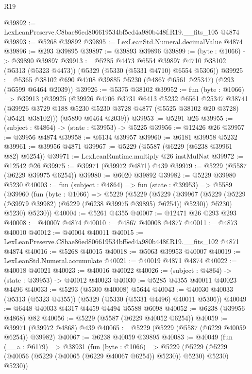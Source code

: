 \begin{lexlean}{R19}
\begin{coremodule}
@39892 := LexLeanPreserve.C8bae86ed806619534bf5ed4a980b448f.R19.__fits_105 @4874
@39893 := @5268 @39892
@39895 := LexLeanStd.Numeral.decimalValue @4874
@39896 := @293 @39895
@39897 := @39893 @39896
@39899 := (byte : @1066) -> @39890 @39897
@39913 := @5285
    @4473
    @6554
    @39897
    @4710
    @38102
    (@5313 (@5323 @4473))
    (@5329 (@5330 (@5331 @4710) @6554 @5306))
@39925 := @5365 @38102 @690 @4708 @39885 @5230 (@4867 @6561 @25347) (@293 (@5599 @6464 @2039))
@39926 := @5375 @38102
@39952 := fun (byte : @1066) =>
  @39913
    (@39925
      (@39926
        @4706
        @3731
        @6413
        @5232
        @6561
        @25347
        @38741
        (@39926 @3729 @188 @5230 @5230 @3728 @4877 (@5525 @38102 @20 @3728) (@5421 @38102)))
      (@5890 @6464 @2039))
@39953 := @5291 @26
@39955 := (subject : @4864) -> (state : @39953) -> @5225
@39956 := @12426 @26
@39957 := @39956 @4874
@39958 := @6134 @39957
@39960 := @6181 @39958 @5232
@39961 := @39956 @4871
@39967 := @5229 (@5587 (@6229 (@6238 @39961 @82) @6254))
@39971 := LexLeanRuntime.multiply @26 instMulNat
@39972 := @12542 @26
@39975 := @39971 (@39972 @4871) @439
@39979 := @5229 (@5587 (@6229 @39975 @6254))
@39980 := @6020 @39892
@39982 := @5229 @39980 @5230
@40003 := fun (subject : @4864) =>
  fun (state : @39953) =>
  @5589
    (@39960
      (fun (byte : @1066) =>
      @5229
        (@5229
          (@5229
            (@39967 (@5229 (@5229 (@39979 @39982) (@6229 (@6238 @39975 @39895) @6254)) @5230))
            @5230)
          @5230)
        @5230))
@40004 := @5261 @4355
@40007 := @12471 @26 @293 @293
@40008 := @40007 @4874
@40010 := @4867 @40008 @4877
@40011 := @4873 @40010
@40012 := @40004 @40011
@40015 := LexLeanPreserve.C8bae86ed806619534bf5ed4a980b448f.R19.__fits_102 @4871 @4874
@40016 := @5268 @40015
@40018 := @5063 @39953 @40007
@40019 := LexLeanStd.Numeral.accumulate
@40021 := @40019 @4871 @4874
@40022 := @40018 @40021
@40023 := @40016 @40022
@40026 := (subject : @4864) -> (state : @39953) -> @40012 @40023
@40030 := @5285 @4355 @40011 @40023 @4496
@40033 := @5293 (@5300 @40008) @5644
@40043 := @40030 @40033 (@5313 (@5323 @4355)) (@5329 (@5330 (@5331 @4496) @40011 @5306))
@40049 := @6448 @40033 @4317 @4459 @4494 @5588 @6098
@40052 := @6238 (@39956 @4868) @82
@40056 := @5229 (@5587 (@6229 @40052 @6254))
@40059 := @39971 (@39972 @4868) @439
@40065 := @5229 (@5229 (@5587 (@6229 @40059 @6254)) @39982)
@40067 := @6238 @40059 @39895
@40083 := @40049
    (fun (__a : @6179) =>
    @38931
      (fun (byte : @1066) =>
      @5229 (@5229 (@5229 (@40056 (@5229 (@40065 (@6229 @40067 @6254)) @5230)) @5230) @5230) @5230))

\end{coremodule}
\end{lexlean}
